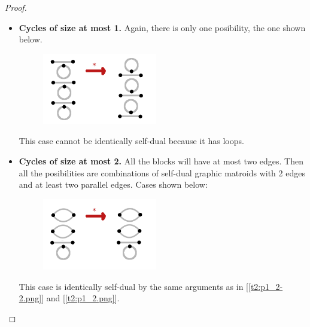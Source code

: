 \begin{proof}
\begin{enumerate}[label=(\roman*)]
                \begin{itemize}
                    \item \textbf{Cycles of size at most 1.}
                        Again, there is only one posibility, the one shown below.
                        \begin{figure}[H]
                            \begin{center}
                            \includegraphics[width=5cm]{Test2/Problem1/1_0-1_0-1_0.png}
                            \end{center}                        
                        \end{figure}\pn
                        This case cannot be identically self-dual because it has loops.
                    \item \textbf{Cycles of size at most 2.}
                        All the blocks will have at most two edges. Then all the posibilities are combinations of self-dual graphic matroids
                        with 2 edges and at least two parallel edges. Cases shown below:
                        \begin{figure}[H]
                            \begin{center}
                            \includegraphics[width=5cm]{Test2/Problem1/2-2-2.png}
                            \end{center}                        
                        \end{figure}\pn
                        This case is identically self-dual by the same arguments as in [\ref{t2:p1_2-2.png}] and [\ref{t2:p1_2.png}].\pn
                        

\end{itemize}
\end{enumerate}
\end{proof}
